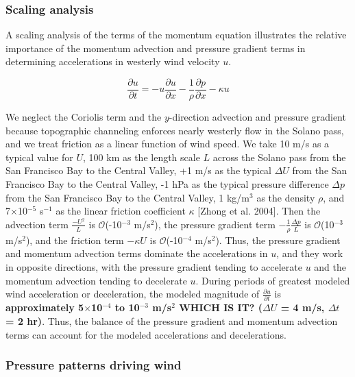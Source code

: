 \subsubsection{Scaling analysis}

A scaling analysis of the terms of the momentum equation illustrates the relative importance of the momentum advection and pressure gradient terms in determining accelerations in westerly wind velocity $u$.  

\begin{equation}
\frac{\partial u}{\partial t} = -u\frac{\partial u}{\partial x} -\frac{1}{\rho} \frac{\partial p}{\partial x} - \kappa u
\end{equation}

We neglect the Coriolis term and the $y$-direction advection and pressure gradient because topographic channeling enforces nearly westerly flow in the Solano pass, and we treat friction as a linear function of wind speed.  We take 10 m/s as a typical value for $U$, 100 km as the length scale $L$ across the Solano pass from the San Francisco Bay to the Central Valley, +1 m/s as the typical $\Delta U$ from the San Francisco Bay to the Central Valley, -1 hPa as the typical pressure difference $\Delta p$ from the San Francisco Bay to the Central Valley, 1 kg/m$^3$ as the density $\rho$, and 7$\times$10$^{-5}$ s$^{-1}$ as the linear friction coefficient $\kappa$ [Zhong et al. 2004]. Then the advection term $\frac{-U^2}{L}$ is $\mathcal{O}$(-10$^{-3}$ m/s$^2$), the pressure gradient term $-\frac{1}{\rho} \frac{\Delta p}{L}$ is $\mathcal{O}$(10$^{-3}$ m/s$^2$), and the friction term $-\kappa U$ is $\mathcal{O}$(-10$^{-4}$ m/s$^2$).  Thus, the pressure gradient and momentum advection terms dominate the accelerations in $u$, and they work in opposite directions, with the pressure gradient tending to accelerate $u$ and the momentum advection tending to decelerate $u$.  During periods of greatest modeled wind acceleration or deceleration, the modeled magnitude of $\frac{\partial u}{\partial t}$ is \textbf{approximately 5$\times$10$^{-4}$ to 10$^{-3}$ m/s$^2$ WHICH IS IT? ($\Delta U$ = 4 m/s, $\Delta t$ = 2 hr)}.  Thus, the balance of the pressure gradient and momentum advection terms can account for the modeled accelerations and decelerations.

\subsubsection{Pressure patterns driving wind}

